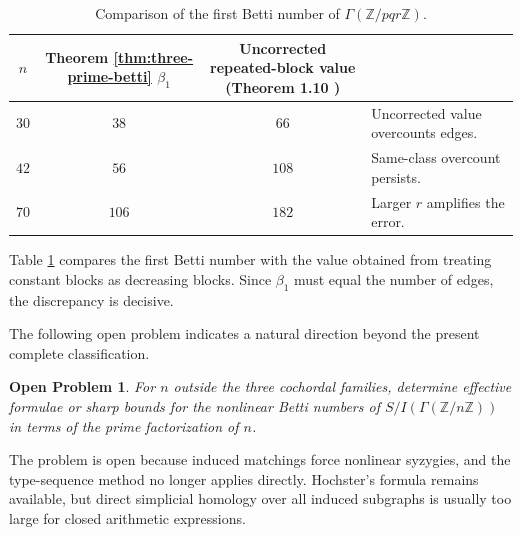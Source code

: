 \documentclass[12pt]{article}
\newtheorem{openproblem}[theorem]{Open Problem}
\theoremstyle{definition}
\begin{document}
\begin{table}[H]
	\centering
	\small
	\renewcommand{\arraystretch}{1.2}
	\begin{tabularx}{\textwidth}{c c c X}
		\toprule
		$n$
		&
		\makecell{Theorem \ref{thm:three-prime-betti}\\$\beta_1$}
		&
		\makecell{Uncorrected repeated-block value\\
			(Theorem 1.10 \cite{DungVu2026})}
		&
		\makecell{Conclusion}
		\\
		\midrule
		$30$ & $38$  & $66$  & Uncorrected value overcounts edges. \\
		$42$ & $56$  & $108$ & Same-class overcount persists. \\
		$70$ & $106$ & $182$ & Larger $r$ amplifies the error. \\
		\bottomrule
	\end{tabularx}
	\caption{Comparison of the first Betti number of $\Gamma(\mathbb{Z}/pqr\mathbb{Z})$.}
	\label{tab:three-prime-beta-one-comparison}
\end{table}

\medskip

Table \ref{tab:three-prime-beta-one-comparison} compares the first Betti number with the value obtained from treating constant blocks as decreasing blocks.  Since $\beta_1$ must equal the number of edges, the discrepancy is decisive.


\medskip

\noindent The following open problem indicates a natural direction beyond the present complete classification.
\begin{openproblem}\label{op:noncochordal}
For $n$ outside the three cochordal families, determine effective formulae or sharp bounds for the nonlinear Betti numbers of $S/I(\Gamma(\mathbb{Z}/n\mathbb{Z}))$ in terms of the prime factorization of $n$.
\end{openproblem}

\medskip

The problem is open because induced matchings force nonlinear syzygies, and the type-sequence method no longer applies directly.  Hochster's formula remains available, but direct simplicial homology over all induced subgraphs is usually too large for closed arithmetic expressions.



\medskip
\end{document}
